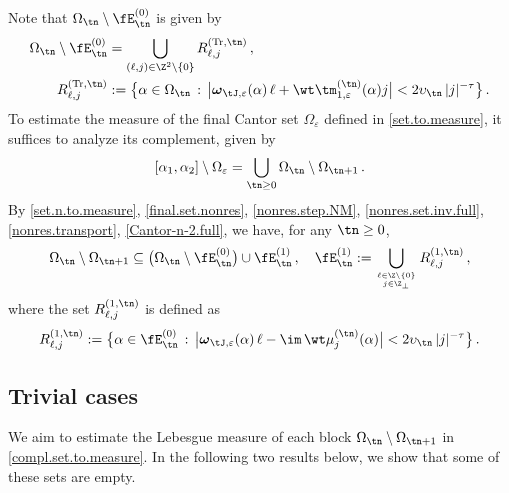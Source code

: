 \documentclass[a4paper,reqno,10pt]{article}
\newcommand{\bomega}{{\boldsymbol{\omega}}}
\begin{document}
 Note that $\Omega_{\tn}\setminus \fE_{\tn}^{(0)}$ is given by
\begin{align}
   \Omega_{\tn}\setminus \fE_{\tn}^{(0)} & = \bigcup_{(\ell,j)\in \Z^2\setminus\{0\}} R_{\ell,j}^{({\rm Tr},\tn)} \,, 
   \\
   R_{\ell,j}^{({\rm Tr},\tn)} & := \big\{  \alpha\in \Omega_{\tn} \, : \, \big|\bomega_{\tJ,\varepsilon}(\alpha)\,\ell + \wt\tm_{1,\varepsilon}^{(\tn)}(\alpha)j \big| <  2\upsilon_{\tn} \, |j|^{-\tau}  \big\}\,. \label{tappo1}
\end{align}
To estimate the measure of the final Cantor set \( \Omega_{\varepsilon} \) defined in \eqref{set.to.measure}, it suffices to analyze its complement, given by
\begin{equation}\label{compl.set.to.measure}
    [\alpha_{1},\alpha_{2}] \setminus \Omega_{\varepsilon} = \bigcup_{\tn \geq 0} \Omega_{\tn}\setminus \Omega_{\tn+1} \,. 
\end{equation}
By \eqref{set.n.to.measure}, \eqref{final.set.nonres}, \eqref{nonres.step.NM}, \eqref{nonres.set.inv.full}, \eqref{nonres.transport}, \eqref{Cantor-n-2.full}, we have, for any $\tn \geq 0$,
\begin{equation}
    \Omega_{\tn}\setminus \Omega_{\tn+1} \subseteq \big( \Omega_{\tn}\setminus \fE_{\tn}^{(0)} \big) \cup \fE_{\tn}^{(1)} \,, \quad  \fE_{\tn}^{(1)} := \bigcup_{\ell \in \Z\setminus\{0\} \atop
    j\in \Z_{\perp} } R_{\ell,j}^{(1,\tn)} \,, \label{tappo4}
\end{equation}
where the set $R_{\ell,j}^{(1,\tn)}$ is defined as
\begin{equation}
    R_{\ell,j}^{(1,\tn)} := \big\{  \alpha \in \fE_{\tn}^{(0)} \, : \, \big|\bomega_{\tJ,\varepsilon}(\alpha)\,\ell -\im\,\wt\mu_{j}^{(\tn)}(\alpha)\big| < 2 \upsilon_{\tn} \, |j|^{-\tau}   \big\}\,. \label{tappo5}
\end{equation}




\subsection{Trivial cases}
We aim to estimate the Lebesgue measure of each block \( \Omega_{\tn} \setminus \Omega_{\tn+1} \) in \eqref{compl.set.to.measure}. In the following two results below, we show that some of these sets are empty.
\end{document}
